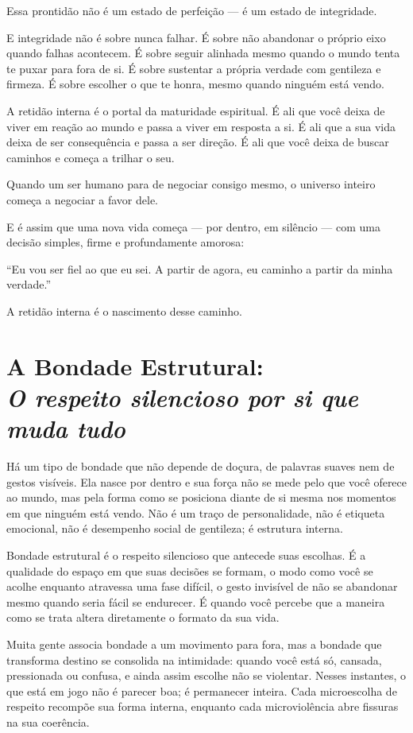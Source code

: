 \documentclass[12pt]{book}
\begin{document}
Essa prontidão não é um estado de perfeição — é um estado de integridade.

E integridade não é sobre nunca falhar. É sobre não abandonar o próprio eixo quando falhas acontecem. É sobre seguir alinhada mesmo quando o mundo tenta te puxar para fora de si. É sobre sustentar a própria verdade com gentileza e firmeza. É sobre escolher o que te honra, mesmo quando ninguém está vendo.

A retidão interna é o portal da maturidade espiritual. É ali que você deixa de viver em reação ao mundo e passa a viver em resposta a si. É ali que a sua vida deixa de ser consequência e passa a ser direção. É ali que você deixa de buscar caminhos e começa a trilhar o seu.

Quando um ser humano para de negociar consigo mesmo, o universo inteiro começa a negociar a favor dele.

E é assim que uma nova vida começa — por dentro, em silêncio — com uma decisão simples, firme e profundamente amorosa:

“Eu vou ser fiel ao que eu sei. A partir de agora, eu caminho a partir da minha verdade.”

A retidão interna é o nascimento desse caminho.

\chapter[A Bondade Estrutural: O respeito silencioso por si que muda tudo]{A Bondade Estrutural:\\[0.4ex]\large\itshape O respeito silencioso por si que muda tudo}

Há um tipo de bondade que não depende de doçura, de palavras suaves nem de gestos visíveis. Ela nasce por dentro e sua força não se mede pelo que você oferece ao mundo, mas pela forma como se posiciona diante de si mesma nos momentos em que ninguém está vendo. Não é um traço de personalidade, não é etiqueta emocional, não é desempenho social de gentileza; é estrutura interna.

Bondade estrutural é o respeito silencioso que antecede suas escolhas. É a qualidade do espaço em que suas decisões se formam, o modo como você se acolhe enquanto atravessa uma fase difícil, o gesto invisível de não se abandonar mesmo quando seria fácil se endurecer. É quando você percebe que a maneira como se trata altera diretamente o formato da sua vida.

Muita gente associa bondade a um movimento para fora, mas a bondade que transforma destino se consolida na intimidade: quando você está só, cansada, pressionada ou confusa, e ainda assim escolhe não se violentar. Nesses instantes, o que está em jogo não é parecer boa; é permanecer inteira. Cada microescolha de respeito recompõe sua forma interna, enquanto cada microviolência abre fissuras na sua coerência.
\end{document}
